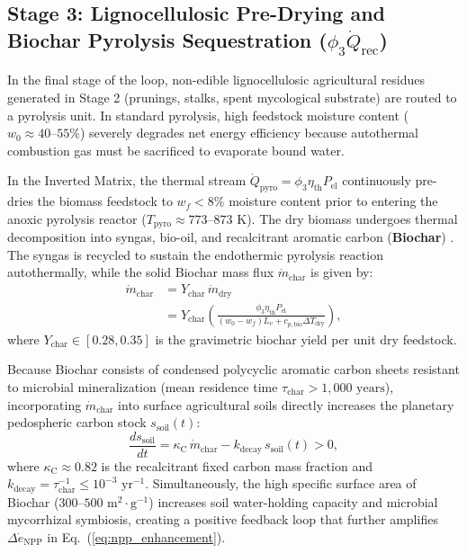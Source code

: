 \documentclass[aps,pre,twocolumn,10pt,superscriptaddress,amsmath,amssymb,amsfonts,floatfix,showkeys]{revtex4-2}
\begin{document}
\subsection{Stage 3: Lignocellulosic Pre-Drying and Biochar Pyrolysis Sequestration (\texorpdfstring{$\phi_3 \dot{Q}_{\text{rec}}$}{phi3 Qrec})}

In the final stage of the loop, non-edible lignocellulosic agricultural residues generated in Stage 2 (prunings, stalks, spent mycological substrate) are routed to a pyrolysis unit. In standard pyrolysis, high feedstock moisture content ($w_0 \approx 40\text{--}55\%$) severely degrades net energy efficiency because autothermal combustion gas must be sacrificed to evaporate bound water.

In the Inverted Matrix, the thermal stream $\dot{Q}_{\text{pyro}} = \phi_3 \eta_{\text{th}} P_{\text{el}}$ continuously pre-dries the biomass feedstock to $w_f < 8\%$ moisture content prior to entering the anoxic pyrolysis reactor ($T_{\text{pyro}} \approx 773\text{--}873\text{ K}$). The dry biomass undergoes thermal decomposition into syngas, bio-oil, and recalcitrant aromatic carbon (\textbf{Biochar}) \cite{Lehmann2015Biochar}. The syngas is recycled to sustain the endothermic pyrolysis reaction autothermally, while the solid Biochar mass flux $\dot{m}_{\text{char}}$ is given by:
\begin{equation}
\begin{aligned}
    \dot{m}_{\text{char}} &= Y_{\text{char}} \, \dot{m}_{\text{dry}} \\
    &= Y_{\text{char}} \left( \frac{\phi_3 \eta_{\text{th}} P_{\text{el}}}{(w_0 - w_f) L_v + c_{p,\text{bio}} \Delta T_{\text{dry}}} \right),
\end{aligned}
\label{eq:biochar_production}
\end{equation}
where $Y_{\text{char}} \in [0.28, 0.35]$ is the gravimetric biochar yield per unit dry feedstock.

Because Biochar consists of condensed polycyclic aromatic carbon sheets resistant to microbial mineralization (mean residence time $\tau_{\text{char}} > 1{,}000\text{ years}$), incorporating $\dot{m}_{\text{char}}$ into surface agricultural soils directly increases the planetary pedospheric carbon stock $s_{\text{soil}}(t)$:
\begin{equation}
    \frac{ds_{\text{soil}}}{dt} = \kappa_{\text{C}} \, \dot{m}_{\text{char}} - k_{\text{decay}} \, s_{\text{soil}}(t) > 0,
    \label{eq:soil_carbon_ode}
\end{equation}
where $\kappa_{\text{C}} \approx 0.82$ is the recalcitrant fixed carbon mass fraction and $k_{\text{decay}} = \tau_{\text{char}}^{-1} \le 10^{-3}\text{ yr}^{-1}$. Simultaneously, the high specific surface area of Biochar ($300\text{--}500\text{ m}^2\cdot\text{g}^{-1}$) increases soil water-holding capacity and microbial mycorrhizal symbiosis, creating a positive feedback loop that further amplifies $\Delta \dot{e}_{\text{NPP}}$ in Eq.~(\ref{eq:npp_enhancement}).
\end{document}
